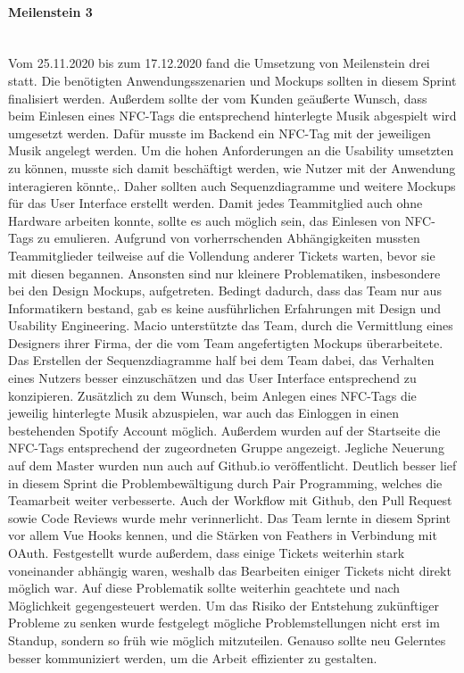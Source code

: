 \documentclass[10pt, a4paper]{article}
\begin{document}
\paragraph*{Meilenstein 3}$~$ \\
Vom 25.11.2020 bis zum 17.12.2020 fand die Umsetzung von Meilenstein drei statt.
Die benötigten Anwendungsszenarien und Mockups sollten in diesem Sprint finalisiert werden.
Außerdem sollte der vom Kunden geäußerte Wunsch, dass beim Einlesen eines NFC-Tags die entsprechend hinterlegte Musik abgespielt wird umgesetzt werden.
Dafür musste im Backend ein NFC-Tag mit der jeweiligen Musik angelegt werden.
Um die hohen Anforderungen an die Usability umsetzten zu können, musste sich damit beschäftigt werden, wie Nutzer mit der Anwendung interagieren könnte,.
Daher sollten auch Sequenzdiagramme und weitere Mockups für das User Interface erstellt werden.
Damit jedes Teammitglied auch ohne Hardware arbeiten konnte, sollte es auch möglich sein, das Einlesen von NFC-Tags zu emulieren.
Aufgrund von vorherrschenden Abhängigkeiten mussten Teammitglieder teilweise auf die Vollendung anderer Tickets warten, bevor sie mit diesen begannen.
Ansonsten sind nur kleinere Problematiken, insbesondere bei den Design Mockups, aufgetreten.
Bedingt dadurch, dass das Team nur aus Informatikern bestand, gab es keine ausführlichen Erfahrungen mit Design und Usability Engineering.
Macio unterstützte das Team, durch die Vermittlung eines Designers ihrer Firma, der die vom Team angefertigten Mockups überarbeitete.
Das Erstellen der Sequenzdiagramme half bei dem Team dabei, das Verhalten eines Nutzers besser einzuschätzen und das User Interface entsprechend zu konzipieren.
Zusätzlich zu dem Wunsch, beim Anlegen eines NFC-Tags die jeweilig hinterlegte Musik abzuspielen, war auch das Einloggen in einen bestehenden Spotify Account möglich.
Außerdem wurden auf der Startseite die NFC-Tags entsprechend der zugeordneten Gruppe angezeigt.
Jegliche Neuerung auf dem Master wurden nun auch auf Github.io veröffentlicht.
Deutlich besser lief in diesem Sprint die Problembewältigung durch Pair Programming, welches die Teamarbeit weiter verbesserte.
Auch der Workflow mit Github, den Pull Request sowie Code Reviews wurde mehr verinnerlicht.
Das Team lernte in diesem Sprint vor allem Vue Hooks kennen, und die Stärken von Feathers in Verbindung mit OAuth.
Festgestellt wurde außerdem, dass einige Tickets weiterhin stark voneinander abhängig waren, weshalb das Bearbeiten einiger Tickets nicht direkt möglich war.
Auf diese Problematik sollte weiterhin geachtete und nach Möglichkeit gegengesteuert werden.
Um das Risiko der Entstehung zukünftiger Probleme zu senken wurde festgelegt mögliche Problemstellungen nicht erst im Standup, sondern so früh wie möglich mitzuteilen.
Genauso sollte neu Gelerntes besser kommuniziert werden, um die Arbeit effizienter zu gestalten.
\end{document}
